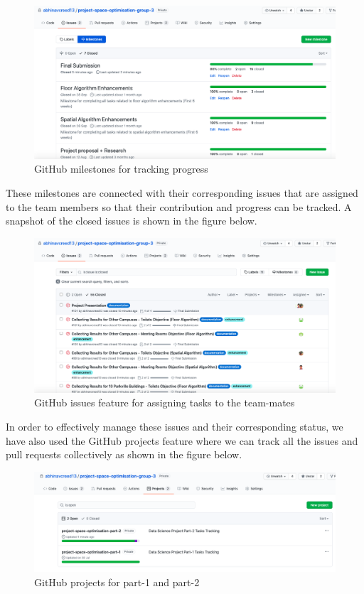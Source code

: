\begin{figure}[H]
\centering
\includegraphics[width=12cm]{resources/images/github/github4.png}
\caption{GitHub milestones for tracking progress}
\label{fig:github4}
\end{figure}

These milestones are connected with their corresponding issues that are assigned to the team members so that their contribution and progress can be tracked. A snapshot of the closed issues is shown in the figure below.

\begin{figure}[H]
\centering
\includegraphics[width=12cm]{resources/images/github/github5.png}
\caption{GitHub issues feature for assigning tasks to the team-mates}
\label{fig:github5}
\end{figure}

In order to effectively manage these issues and their corresponding status, we have also used the GitHub projects feature where we can track all the issues and pull requests collectively as shown in the figure below.

\begin{figure}[H]
\centering
\includegraphics[width=12cm]{resources/images/github/github6.png}
\caption{GitHub projects for part-1 and part-2}
\label{fig:github6}
\end{figure}

